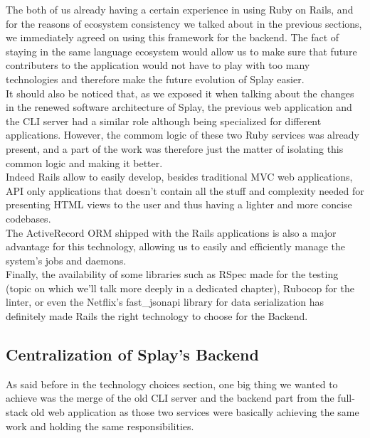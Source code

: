\documentclass{eplmastersthesis}
\begin{document}
        The both of us already having a certain experience in using Ruby on
        Rails, and for the reasons of ecosystem consistency we talked about
        in the previous sections, we immediately agreed on using this
        framework for the backend. The fact of staying in the same language
        ecosystem would allow us to make sure that future contributers to
        the application would not have to play with too many technologies and
        therefore make the future evolution of Splay easier.\\
        It should also be noticed that, as we exposed it when talking about the
        changes in the renewed software architecture of Splay, the previous
        web application and the CLI server had a similar role although being
        specialized for different applications. However, the commom logic
        of these two Ruby services was already present, and a part of the
        work was therefore just the matter of isolating this common logic
        and making it better.\\

        Indeed Rails allow to easily develop, besides traditional MVC web
        applications, API only applications that doesn't contain all the stuff
        and complexity needed for presenting HTML views to the user and thus
        having a lighter and more concise codebases.\\
        The ActiveRecord \cite{activerecord} ORM shipped with the Rails
        applications is also a major advantage for this technology, allowing us
        to easily and efficiently manage the system's jobs and daemons.\\
        Finally, the availability of some libraries such as RSpec made for the
        testing (topic on which we'll talk more deeply in a dedicated chapter),
        Rubocop for the linter, or even the Netflix's fast\_jsonapi library for
        data serialization has definitely made Rails the right technology to
        choose for the Backend.

      \subsection{Centralization of Splay's Backend}

        As said before in the technology choices section, one big thing
        we wanted to achieve was the merge of the old CLI server and
        the backend part from the full-stack old web application as those two
        services were basically achieving the same work and holding the
        same responsibilities.\\
\end{document}
